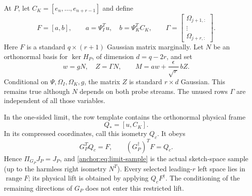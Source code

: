 \documentclass[11pt,oneside,openany,a4paper]{book}
\numberwithin{equation}{chapter}
\theoremstyle{definition}
\theoremstyle{remark}
\DeclareMathOperator{\ran}{range}\DeclareMathOperator{\OPT}{OPT}
\begin{document}
At $P$, let $C_K=[e_n,\ldots,e_{n+r-1}]$ and define
\[
 F=[a,b],\qquad a=\Psi_I^Tu,\quad b=\Psi_K^TC_K,
 \qquad \Gamma=\begin{bmatrix}\Omega_{j+1,:}\\\vdots\\\Omega_{j+r,:}\end{bmatrix}.
\]
Here $F$ is a standard $q\times(r+1)$ Gaussian matrix marginally. Let $N$ be an orthonormal basis for $\ker H_P$, of dimension $d=q-2r$, and set
\begin{equation}\label{anchor:eq:limit-sample}
 w=gN,\quad Z=\Gamma N,\qquad
 M=a w+\frac\epsilon{\sqrt r}\,bZ.
\end{equation}
Conditional on $\Psi,\Omega_I,\Omega_K,g$, the matrix $Z$ is standard $r\times d$ Gaussian. This remains true although $N$ depends on both probe streams. The unused rows $\Gamma$ are independent of all those variables.

In the one-sided limit, the row template contains the orthonormal physical frame
\[
 Q_*=[u,C_K].
\]
In its compressed coordinates, call this isometry $Q_c$. It obeys
\begin{equation}\label{anchor:eq:lift-F}
 G_P^TQ_c=F,\qquad (G_P^\dagger)^TF=Q_c.
\end{equation}
Hence $\Pi_{G_P}J_P=J_P$, and \eqref{anchor:eq:limit-sample} is the actual sketch-space sample (up to the harmless right isometry $N^T$). Every selected leading-$r$ left space lies in $\ran F$; its physical lift is obtained by applying $Q_cF^\dagger$. The conditioning of the remaining directions of $G_P$ does not enter this restricted lift.
\end{document}
